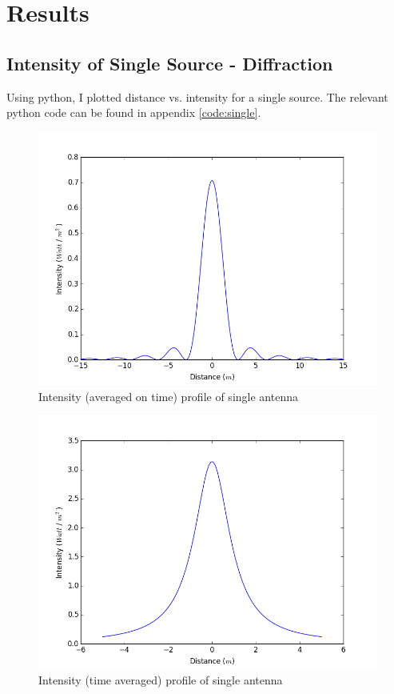 \chapter{Results}

\section{Intensity of Single Source - Diffraction}

Using python, I plotted distance vs. intensity for a single source. The relevant python code can be found in appendix \ref{code:single}.

\begin{figure}[!h]
\centering	
\includegraphics[scale=0.45]{figure_1.png}
\caption{Intensity (averaged on time) profile of single antenna}
\end{figure}

\begin{figure}[!h]
\centering	
\includegraphics[scale=0.45]{figure_2.png}
\caption{Intensity (time averaged) profile of single antenna}
\end{figure}

